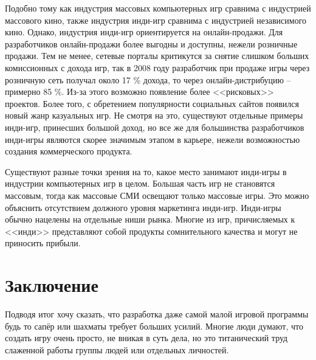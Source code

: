 Подобно тому как индустрия массовых компьютерных игр сравнима с индустрией массового кино, также
индустрия инди-игр сравнима с индустрией независимого кино\cite{2.13,2.34}. Однако, индустрия инди-игр
ориентируется на онлайн-продажи\cite{2.34}. Для разработчиков онлайн-продажи более выгодны\cite{2.20} и 
доступны, нежели розничные продажи. Тем не менее, сетевые порталы критикутся за снятие слишком больших 
комиссионных с дохода игр\cite{2.15}, так в 2008 году разработчик при продаже игры через розничную сеть 
получал около 17 \% дохода, то через онлайн-дистрибуцию -- примерно 85 \%\cite{2.20}. Из-за этого возможно 
появление более <<рисковых>> проектов\cite{2.20}. Более того, с обретением популярности социальных сайтов 
появился новый жанр казуальных игр\cite{2.5}. Не смотря на это, существуют отдельные примеры инди-игр, 
принесших большой доход, но все же для большинства разработчиков инди-игры являются скорее значимым этапом в 
карьере, нежели возможностью создания коммерческого продукта.

Существуют разные точки зрения на то, какое место занимают инди-игры в индустрии компьютерных игр в
целом\cite{2.16}. Большая часть игр не становятся массовым, тогда как массовые СМИ освещают только массовые
игры\cite{2.36,2.5}. Это можно объяснить отсутствием должного уровня маркетинга инди-игр\cite{2.36}. 
Инди-игры обычно нацелены на отдельные ниши рынка\cite{2.19}. Многие из игр, причисляемых к <<инди>> 
представляют собой продукты сомнительного качества и могут не приносить прибыли\cite{2.7}.

\chapter{Заключение}
Подводя итог хочу сказать, что разработка даже самой малой игровой программы будь то сапёр или шахматы 
требует больших усилий. Многие люди думают, что создать игру очень просто, не вникая в суть дела, но это титанический труд слаженной работы группы людей или отдельных личностей. 

